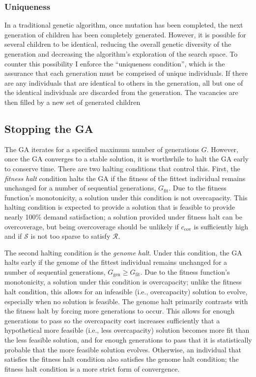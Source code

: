 \documentclass[12pt,dvipsnames]{report}
\begin{document}
\subsubsection{Uniqueness}

In a traditional genetic algorithm, once mutation has been completed, the next generation of children has been completely generated.  However, it is possible for several children to be identical, reducing the overall genetic diversity of the generation and decreasing the algorithm's exploration of the search space.  To counter this possibility I enforce the ``uniqueness condition'', which is the assurance that each generation must be comprised of unique individuals.  If there are any individuals that are identical to others in the generation, all but one of the identical individuals are discarded from the generation.  The vacancies are then filled by a new set of generated children

\subsection{Stopping the GA} \label{subsec:ga_stop}

The GA iterates for a specified maximum number of generations $G$.  However, once the GA converges to a stable solution, it is worthwhile to halt the GA early to conserve time.  There are two halting conditions that control this.  First, the \emph{fitness halt} condition halts the GA if the fitness of the fittest individual remains unchanged for a number of sequential generations, $G_{\text{fit}}$.  Due to the fitness function's monotonicity, a solution under this condition is not overcapacity.  This halting condition is expected to provide a solution that is feasible to provide nearly 100\% demand satisfaction; a solution provided under fitness halt can be overcoverage, but being overcoverage should be unlikely if $c_{\text{cov}}$ is sufficiently high and if $\mathcal{S}$ is not too sparse to satisfy $\mathcal{R}$.

The second halting condition is the \emph{genome halt}.  Under this condition, the GA halts early if the genome of the fittest individual remains unchanged for a number of sequential generations, $G_{\text{gen}} \geq G_{\text{fit}}$.  Due to the fitness function's monotonicity, a solution under this condition is overcapacity; unlike the fitness halt condition, this allows for an infeasible (i.e., overcapacity) solution to evolve, especially when no solution is feasible.  The genome halt primarily contrasts with the fitness halt by forcing more generations to occur.  This allows for enough generations to pass so the overcapacity cost increases sufficiently that a hypothetical more feasible (i.e., less overcapacity) solution becomes more fit than the less feasible solution, and for enough generations to pass that it is statistically probable that the more feasible solution evolves.  Otherwise, an individual that satisfies the fitness halt condition also satisfies the genome halt condition; the fitness halt condition is a more strict form of convergence.
\end{document}
